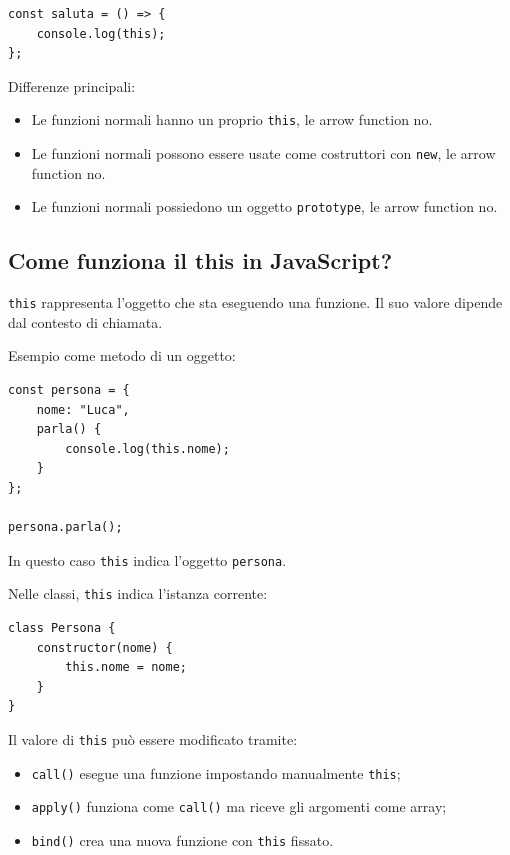 \documentclass[12pt]{article}
\begin{document}
\begin{verbatim}
const saluta = () => {
    console.log(this);
};
\end{verbatim}

Differenze principali:

\begin{itemize}
    \item Le funzioni normali hanno un proprio \texttt{this}, le arrow function no.
    \item Le funzioni normali possono essere usate come costruttori con \texttt{new}, le arrow function no.
    \item Le funzioni normali possiedono un oggetto \texttt{prototype}, le arrow function no.
\end{itemize}


\subsection{Come funziona il this in JavaScript?}

\texttt{this} rappresenta l'oggetto che sta eseguendo una funzione. Il suo valore dipende dal contesto di chiamata.

Esempio come metodo di un oggetto:

\begin{verbatim}
const persona = {
    nome: "Luca",
    parla() {
        console.log(this.nome);
    }
};

persona.parla();
\end{verbatim}

In questo caso \texttt{this} indica l'oggetto \texttt{persona}.

Nelle classi, \texttt{this} indica l'istanza corrente:

\begin{verbatim}
class Persona {
    constructor(nome) {
        this.nome = nome;
    }
}
\end{verbatim}

Il valore di \texttt{this} può essere modificato tramite:

\begin{itemize}
    \item \texttt{call()} esegue una funzione impostando manualmente \texttt{this};
    \item \texttt{apply()} funziona come \texttt{call()} ma riceve gli argomenti come array;
    \item \texttt{bind()} crea una nuova funzione con \texttt{this} fissato.
\end{itemize}
\end{document}

